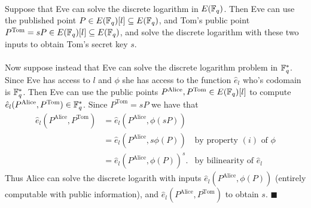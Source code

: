 \documentclass[letterpaper,12pt,oneside,onecolumn]{article}
\begin{document}
\paragraph{}
Suppose that Eve can solve the discrete logarithm in $E(\mathbb{F}_q)$. Then Eve can use the published point $P \in E(\mathbb{F}_q)[l] \subseteq E(\mathbb{F}_q)$, and Tom's public point $P^{\text{Tom}} = sP \in E(\mathbb{F}_q)[l] \subseteq E(\mathbb{F}_q)$, and solve the discrete logarithm with these two inputs to obtain Tom's secret key $s$.
\paragraph{}
Now suppose instead that Eve can solve the discrete logarithm problem in $\mathbb{F}_q^*$. Since Eve has access to $l$ and $\phi$ she has access to the function $\hat{e}_l$ who's codomain is $\mathbb{F}_q^*$. Then Eve can use the public points $P^\text{Alice}, P^{\text{Tom}} \in E(\mathbb{F}_q)[l]$ to compute $\hat{e}_l(P^\text{Alice}, P^{\text{Tom}}) \in \mathbb{F}_q^*$. Since $P^{\text{Tom}} = sP$ we have that 
\begin{align*}
\hat{e}_l(P^\text{Alice}, P^{\text{Tom}}) &= \hat{e}_l(P^\text{Alice}, \phi(sP))\\
&= \hat{e}_l(P^\text{Alice}, s\phi(P)) &\text{by property $(i)$ of $\phi$} \\
&= \hat{e}_l(P^\text{Alice},\phi(P))^s. &\text{by bilinearity of $\hat{e}_l$}
\end{align*}
Thus Alice can solve the discrete logarith with inputs $\hat{e}_l(P^\text{Alice},\phi(P))$ (entirely computable with public information), and $\hat{e}_l(P^\text{Alice}, P^{\text{Tom}})$ to obtain $s$. $\blacksquare$
\end{document}
